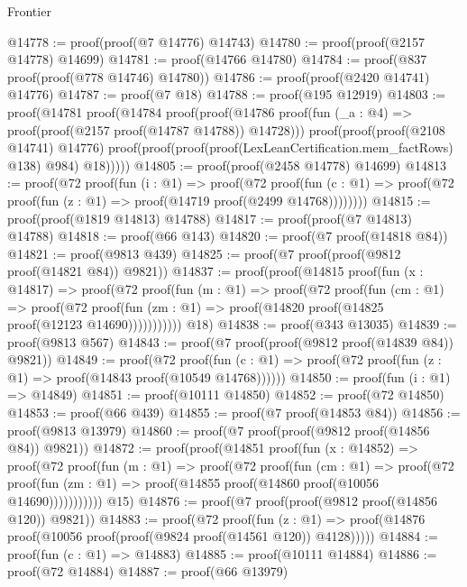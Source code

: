 \begin{lexlean}{Frontier}
\begin{coremodule}
@14778 := proof(proof(@7 @14776) @14743)
@14780 := proof(proof(@2157 @14778) @14699)
@14781 := proof(@14766 @14780)
@14784 := proof(@837 proof(proof(@778 @14746) @14780))
@14786 := proof(proof(@2420 @14741) @14776)
@14787 := proof(@7 @18)
@14788 := proof(@195 @12919)
@14803 := proof(@14781
      proof(@14784
          proof(proof(@14786
                proof(fun (_a : @4) => proof(proof(@2157 proof(@14787 @14788)) @14728)))
              proof(proof(proof(@2108 @14741) @14776)
                  proof(proof(proof(proof(LexLeanCertification.mem_factRows) @138) @984) @18)))))
@14805 := proof(proof(@2458 @14778) @14699)
@14813 := proof(@72
      proof(fun (i : @1) =>
        proof(@72
            proof(fun (c : @1) =>
              proof(@72 proof(fun (z : @1) => proof(@14719 proof(@2499 @14768))))))))
@14815 := proof(proof(@1819 @14813) @14788)
@14817 := proof(proof(@7 @14813) @14788)
@14818 := proof(@66 @143)
@14820 := proof(@7 proof(@14818 @84))
@14821 := proof(@9813 @439)
@14825 := proof(@7 proof(proof(@9812 proof(@14821 @84)) @9821))
@14837 := proof(proof(@14815
        proof(fun (x : @14817) =>
          proof(@72
              proof(fun (m : @1) =>
                proof(@72
                    proof(fun (cm : @1) =>
                      proof(@72
                          proof(fun (zm : @1) =>
                            proof(@14820 proof(@14825 proof(@12123 @14690)))))))))))
      @18)
@14838 := proof(@343 @13035)
@14839 := proof(@9813 @567)
@14843 := proof(@7 proof(proof(@9812 proof(@14839 @84)) @9821))
@14849 := proof(@72
      proof(fun (c : @1) => proof(@72 proof(fun (z : @1) => proof(@14843 proof(@10549 @14768))))))
@14850 := proof(fun (i : @1) => @14849)
@14851 := proof(@10111 @14850)
@14852 := proof(@72 @14850)
@14853 := proof(@66 @439)
@14855 := proof(@7 proof(@14853 @84))
@14856 := proof(@9813 @13979)
@14860 := proof(@7 proof(proof(@9812 proof(@14856 @84)) @9821))
@14872 := proof(proof(@14851
        proof(fun (x : @14852) =>
          proof(@72
              proof(fun (m : @1) =>
                proof(@72
                    proof(fun (cm : @1) =>
                      proof(@72
                          proof(fun (zm : @1) =>
                            proof(@14855 proof(@14860 proof(@10056 @14690)))))))))))
      @15)
@14876 := proof(@7 proof(proof(@9812 proof(@14856 @120)) @9821))
@14883 := proof(@72
      proof(fun (z : @1) =>
        proof(@14876 proof(@10056 proof(proof(@9824 proof(@14561 @120)) @4128)))))
@14884 := proof(fun (c : @1) => @14883)
@14885 := proof(@10111 @14884)
@14886 := proof(@72 @14884)
@14887 := proof(@66 @13979)

\end{coremodule}
\end{lexlean}
